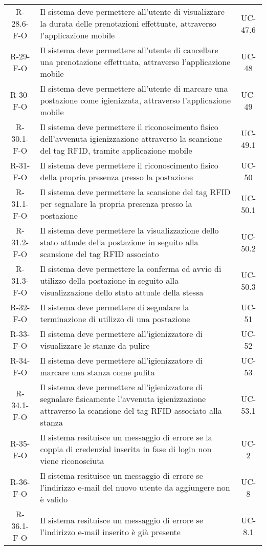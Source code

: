\begin{longtable}{ c C{9.5cm} c }
    R-28.6-F-O & Il sistema deve permettere all'utente di visualizzare la durata delle prenotazioni effettuate, attraverso l'applicazione mobile& UC-47.6\\
    R-29-F-O & Il sistema deve permettere all'utente di cancellare una prenotazione effettuata, attraverso l'applicazione mobile& UC-48\\
    R-30-F-O & Il sistema deve permettere all'utente di marcare una postazione come igienizzata, attraverso l'applicazione mobile& UC-49\\
    R-30.1-F-O & Il sistema deve permettere il riconoscimento fisico dell'avvenuta igienizzazione attraverso la scansione del tag RFID, tramite applicazione mobile& UC-49.1\\
    R-31-F-O & Il sistema deve permettere il riconoscimento fisico della propria presenza presso la postazione& UC-50\\
    R-31.1-F-O & Il sistema deve permettere la scansione del tag RFID per segnalare la propria presenza presso la postazione& UC-50.1\\
    R-31.2-F-O & Il sistema deve permettere la visualizzazione dello stato attuale della postazione in seguito alla scansione del tag RFID associato& UC-50.2\\
    R-31.3-F-O & Il sistema deve permettere la conferma ed avvio di utilizzo della postazione in seguito alla visualizzazione dello stato attuale della stessa& UC-50.3\\
    R-32-F-O & Il sistema deve permettere di segnalare la terminazione di utilizzo di una postazione& UC-51\\
    R-33-F-O & Il sistema deve permettere all'igienizzatore di visualizzare le stanze da pulire& UC-52\\
    R-34-F-O & Il sistema deve permettere all'igienizzatore di marcare una stanza come pulita& UC-53\\
    R-34.1-F-O & Il sistema deve permettere all'igienizzatore di segnalare fisicamente l'avvenuta igienizzazione attraverso la scansione del tag RFID associato alla stanza& UC-53.1\\
    R-35-F-O & Il sistema resituisce un messaggio di errore se la coppia di credenzial inserita in fase di  login non viene riconosciuta& UC-2\\
    R-36-F-O & Il sistema resituisce un messaggio di errore se l'indirizzo e-mail del nuovo utente da aggiungere non è valido& UC-8\\
    R-36.1-F-O & Il sistema resituisce un messaggio di errore se l'indirizzo e-mail inserito è già presente& UC-8.1\\

\end{longtable}
